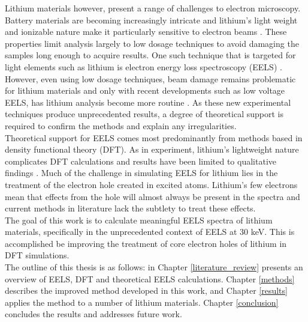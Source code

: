 Lithium materials however, present a range of challenges to electron microscopy.  Battery materials are becoming increasingly intricate and lithium's light weight and ionizable nature make it particularly sensitive to electron beams \cite{kobayashi_quantitative_2017}.  These properties limit analysis largely to low dosage techniques to avoid damaging the samples long enough to acquire results.  One such technique that is targeted for light elements such as lithium is electron energy loss spectroscopy (EELS) \cite{Egerton}.  However, even using low dosage techniques,  beam damage remains problematic for lithium materials and only with recent developments such as low voltage EELS, has lithium analysis become more routine \cite{SU_9000}. As these new experimental techniques produce unprecedented results, a degree of theoretical support is required to confirm the methods and explain any irregularities.  
\\

Theoretical support for EELS  comes most predominantly from methods based in density functional theory (DFT).  As in experiment, lithium's lightweight nature complicates DFT calculations and results have been limited to qualitative findings \cite{mauchamp_ab_2006, mauchamp_local_2008}. Much of the challenge in simulating EELS for lithium lies in the treatment of the electron hole created in excited atoms.  Lithium's few electrons mean that effects from the hole will almost always be present in the spectra and current methods in literature lack the subtlety to treat these effects. \\

The goal of this work is to calculate meaningful EELS spectra of lithium materials, specifically in the unprecedented context of EELS at 30 keV. This is accomplished be improving the treatment of core electron holes of lithium in DFT simulations. \\

The outline of this thesis is as follows: in Chapter \ref{literature_review} presents an overview of EELS, DFT and theoretical EELS calculations.  Chapter \ref{methods} describes the improved method developed in this work, and Chapter \ref{results} applies the method to a number of lithium materials.  Chapter \ref{conclusion} concludes the results and addresses future work.


